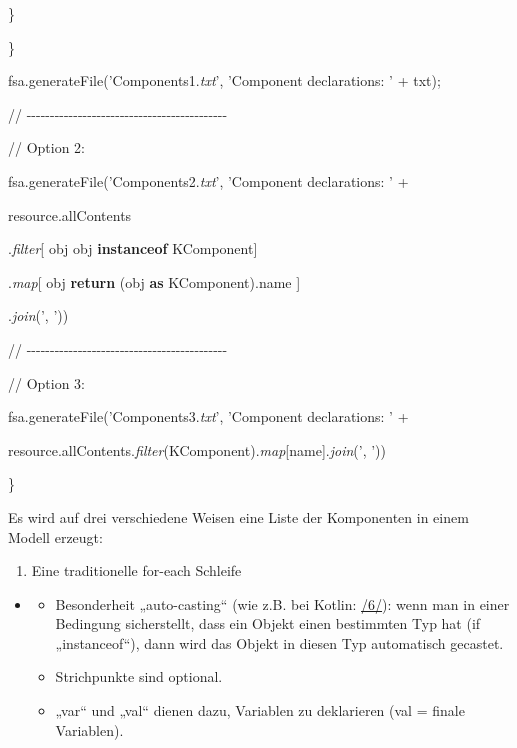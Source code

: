 \documentclass[a4]{article}
\providecommand{\tightlist}{%
  \setlength{\itemsep}{0pt}\setlength{\parskip}{0pt}}
\begin{document}
\}

\}

fsa.generateFile('Components1.\emph{txt}', 'Component declarations: ' +
txt);

//
-\/-\/-\/-\/-\/-\/-\/-\/-\/-\/-\/-\/-\/-\/-\/-\/-\/-\/-\/-\/-\/-\/-\/-\/-\/-\/-\/-\/-\/-\/-\/-\/-\/-\/-\/-\/-\/-\/-\/-\/-\/-\/-

// Option 2:

fsa.generateFile('Components2.\emph{txt}', 'Component declarations: ' +

resource.allContents

.\emph{filter}{[} obj \textbar{} obj \textbf{instanceof} KComponent{]}

.\emph{map}{[} obj \textbar{} \textbf{return} (obj \textbf{as}
KComponent).name {]}

.\emph{join}(', '))

//
-\/-\/-\/-\/-\/-\/-\/-\/-\/-\/-\/-\/-\/-\/-\/-\/-\/-\/-\/-\/-\/-\/-\/-\/-\/-\/-\/-\/-\/-\/-\/-\/-\/-\/-\/-\/-\/-\/-\/-\/-\/-\/-

// Option 3:

fsa.generateFile('Components3.\emph{txt}', 'Component declarations: ' +

resource.allContents.\emph{filter}(KComponent).\emph{map}{[}name{]}.\emph{join}(',
'))

\}

Es wird auf drei verschiedene Weisen eine Liste der Komponenten in einem
Modell erzeugt:

\begin{enumerate}
\def\labelenumi{\arabic{enumi}.}
\tightlist
\item
  Eine traditionelle for-each Schleife
\end{enumerate}

\begin{itemize}
\item
  \begin{itemize}
  \tightlist
  \item
    Besonderheit „auto-casting`` (wie z.B. bei Kotlin:
    \protect\hyperlink{anchor-11}{/6/}): wenn man in einer Bedingung
    sicherstellt, dass ein Objekt einen bestimmten Typ hat (if
    „instanceof``), dann wird das Objekt in diesen Typ automatisch
    gecastet.
  \item
    Strichpunkte sind optional.
  \item
    „var`` und „val`` dienen dazu, Variablen zu deklarieren (val =
    finale Variablen).
  \end{itemize}
\end{itemize}
\end{document}
